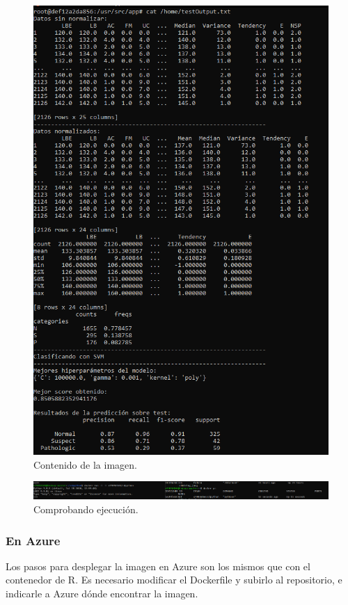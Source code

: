\begin{figure}[H]\center\includegraphics[width=.95\linewidth]{img/python/p3.png}\caption{Contenido de la imagen.}\end{figure}

\begin{figure}[H]\center\includegraphics[width=.99\linewidth]{img/python/p5.png}\caption{Comprobando ejecución.}\end{figure}

\subsubsection{En Azure}

Los pasos para desplegar la imagen en Azure son los mismos que con el contenedor de R. Es necesario modificar el Dockerfile y subirlo al repositorio, e indicarle a Azure dónde encontrar la imagen.

